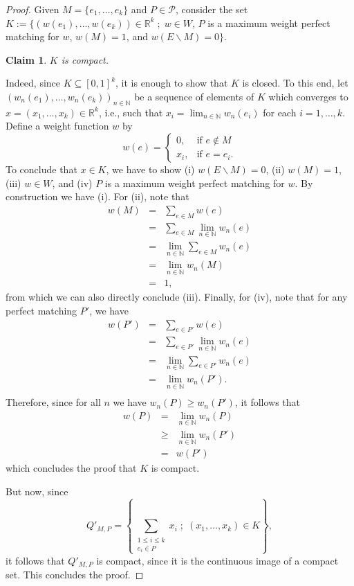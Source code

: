 \documentclass{article}
\newtheorem{claim}{Claim}[thm]
\begin{document}
\begin{proof}
Given $M = \{e_1,\ldots,e_k\}$ and $P \in \mathcal{P}$, consider the set $K := \{ (w(e_1),\ldots,w(e_k)) \in \mathbb{R}^k \;;\; w\in W$, $P$ is a maximum weight perfect matching for $w$, $w(M)=1$, and $w(E \smallsetminus M)=0\}$.

\begin{claim}
	$K$ is compact.
\end{claim}
Indeed, since $K \subseteq [0,1]^k$, it is enough to show that $K$ is closed.
To this end, let $(w_n(e_1),\ldots,w_n(e_k))_{n\in \mathbb{N}}$ be a sequence of elements of $K$ which converges to $x = (x_1,\ldots,x_k) \in \mathbb{R}^k$, i.e., such that $x_i = \lim_{n \in \mathbb{N}} w_n(e_i)$ for each $i = 1,\ldots,k$.
Define a weight function $w$ by 
	\[ 	w(e) = 
			\begin{cases}
				0,&\text{if } e \not \in M \\
				x_i,&\text{if } e = e_i.
			\end{cases} \]
To conclude that $x \in K$, we have to show (i) $w(E \smallsetminus M) = 0$, (ii) $w(M) = 1$, (iii) $w \in W$, and (iv) $P$ is a maximum weight perfect matching for $w$.
By construction we have (i). 
For (ii), note that 
\[\begin{array}{rcl}
		w(M) 
		&=& \displaystyle\sum_{e\in M} w(e) \\
		&=& \displaystyle\sum_{e\in M} \lim_{n \in \mathbb{N}} w_n(e) \\
		&=& \displaystyle\lim_{n \in \mathbb{N}}\sum_{e\in M}  w_n(e) \\
		&=& \displaystyle\lim_{n \in \mathbb{N}}w_n(M) \\
		&=& 1,
	\end{array} \]
from which we can also directly conclude (iii).
Finally, for (iv), note that for any perfect matching $P'$, we have 
\[\begin{array}{rcl}
		w(P') 
		&=& \displaystyle\sum_{e\in P'} w(e) \\
		&=& \displaystyle\sum_{e\in P'} \lim_{n \in \mathbb{N}} w_n(e) \\
		&=& \displaystyle\lim_{n \in \mathbb{N}}\sum_{e\in P'}  w_n(e) \\
		&=& \displaystyle\lim_{n \in \mathbb{N}}w_n(P'). \\
	\end{array} \]
Therefore, since for all $n$ we have $w_n(P) \geq w_n(P')$, it follows that \[\begin{array}{rcl}
		w(P) 
		&=& \displaystyle\lim_{n \in \mathbb{N}}w_n(P) \\
		&\geq& \displaystyle\lim_{n \in \mathbb{N}}w_n(P') \\
		&=& w(P')
	\end{array} \]
which concludes the proof that $K$ is compact.

But now, since 
	\[ Q'_{M,P} = \left\{\sum_{\substack{1 \leq i \leq k \\e_i \in P}} x_i \;;\; (x_1,\ldots,x_k) \in K \right\},\] 
it follows that $Q'_{M,P}$ is compact, since it is the continuous image of a compact set.
This concludes the proof.
\end{proof}
\end{document}

